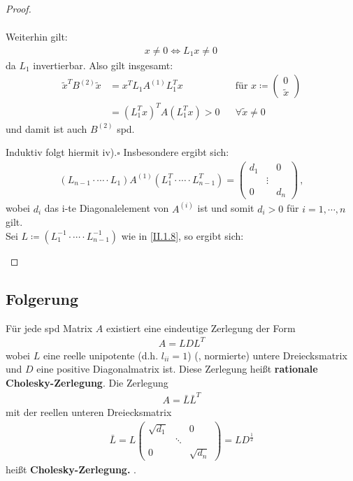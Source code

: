\documentclass[ngerman,fontsize=11pt, paper=a4, parskip=half, titlepage=true, toc=bib]{scrbook}
\theoremstyle{definition}
\theoremstyle{plain}
\newcommand{\subsectione}[1]{\subsection{#1} \addtocounter{Def}{1}}
\begin{document}
\begin{proof}
\begin{enumerate}[i)]
\begin{align*}
    			\end{align*}
    			Weiterhin gilt:
    			\begin{gather*}
    			x\neq 0 \Leftrightarrow L_1 x\neq 0 \,
    			\end{gather*}
    			da $L_1$ invertierbar. Also gilt insgesamt:
    			\begin{align*}
    			\widetilde{x}^TB^{(2)} \widetilde{x} &= x^T L_1A^{(1)}L_1^Tx
    			&&  \text{für } x\coloneqq \begin{pmatrix}	0 \\ \widetilde{x}\end{pmatrix}\\
    			&= (L_1^Tx)^TA(L_1^Tx) > 0
    			&& \forall \widetilde{x}\neq 0 
    			\end{align*}
    			und damit ist auch $B^{(2)}$ spd.
    			
    			Induktiv folgt hiermit iv).\hfill $\square$
    			Insbesondere ergibt sich: 
    			\begin{gather*}
    			(L_{n-1}\cdot \cdots\cdot L_1)A^{(1)}(L_1^T\cdot \cdots \cdot L_{n-1}^T) 
    			= \begin{pmatrix} d_1 & & 0 \\ &\vdots& \\ 0&& d_n\end{pmatrix} \, ,
    			\end{gather*}
    			wobei $d_i$ das i-te Diagonalelement von $A^{(i)}$ ist und somit $d_i>0$ für $ i= 1, \cdots , n$ gilt. \\
    			
    			Sei $L\coloneqq (L_1^{-1}\cdot \cdots \cdot L_{n-1}^{-1})$ wie in \eqref{II.1.8}, so ergibt sich:
    		\end{enumerate}
    	\end{proof}		
  
  \subsectione{Folgerung} \label{4.2.2}
  Für jede spd Matrix $A$ existiert eine eindeutige Zerlegung der Form 
  \begin{gather*}
    A= LDL^T
  \end{gather*}
  wobei $L$ eine reelle unipotente (d.h. $l_{ii}=1$)  (, normierte)  untere 
  Dreiecksmatrix  und $D$ eine positive Diagonalmatrix ist. 
  Diese Zerlegung heißt \textbf{rationale Cholesky-Zerlegung}. Die Zerlegung
  \begin{gather}
    A= \bar{L}\bar{L}^T 
    \label{IV.2.2}
  \end{gather}
  mit der reellen unteren Dreiecksmatrix
  \begin{gather*}
    \bar{L} = L \begin{pmatrix}
      \sqrt{d_1} &&0 \\
      & \ddots & \\
      0&& \sqrt{d_n}
    \end{pmatrix} = LD^{\frac{1}{2}}
  \end{gather*}
  heißt \textbf{Cholesky-Zerlegung.} .
  
\end{document}
